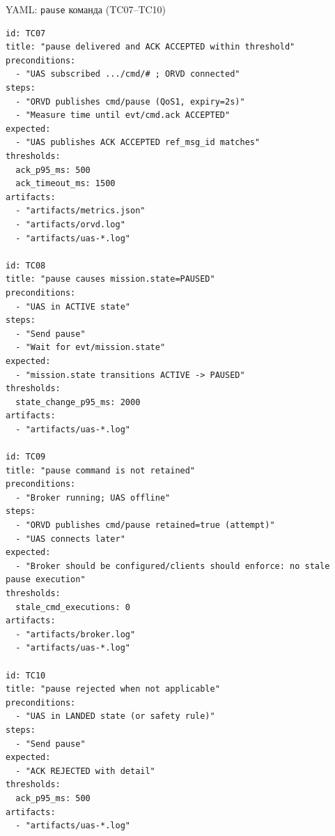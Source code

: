 \documentclass[aspectratio=169]{beamer}
\begin{document}
\begin{frame}{YAML: \texttt{pause} команда (TC07--TC10)}
\small
\begin{verbatim}
id: TC07
title: "pause delivered and ACK ACCEPTED within threshold"
preconditions:
  - "UAS subscribed .../cmd/# ; ORVD connected"
steps:
  - "ORVD publishes cmd/pause (QoS1, expiry=2s)"
  - "Measure time until evt/cmd.ack ACCEPTED"
expected:
  - "UAS publishes ACK ACCEPTED ref_msg_id matches"
thresholds:
  ack_p95_ms: 500
  ack_timeout_ms: 1500
artifacts:
  - "artifacts/metrics.json"
  - "artifacts/orvd.log"
  - "artifacts/uas-*.log"

id: TC08
title: "pause causes mission.state=PAUSED"
preconditions:
  - "UAS in ACTIVE state"
steps:
  - "Send pause"
  - "Wait for evt/mission.state"
expected:
  - "mission.state transitions ACTIVE -> PAUSED"
thresholds:
  state_change_p95_ms: 2000
artifacts:
  - "artifacts/uas-*.log"

id: TC09
title: "pause command is not retained"
preconditions:
  - "Broker running; UAS offline"
steps:
  - "ORVD publishes cmd/pause retained=true (attempt)"
  - "UAS connects later"
expected:
  - "Broker should be configured/clients should enforce: no stale pause execution"
thresholds:
  stale_cmd_executions: 0
artifacts:
  - "artifacts/broker.log"
  - "artifacts/uas-*.log"

id: TC10
title: "pause rejected when not applicable"
preconditions:
  - "UAS in LANDED state (or safety rule)"
steps:
  - "Send pause"
expected:
  - "ACK REJECTED with detail"
thresholds:
  ack_p95_ms: 500
artifacts:
  - "artifacts/uas-*.log"
\end{verbatim}
\end{frame}
\end{document}
